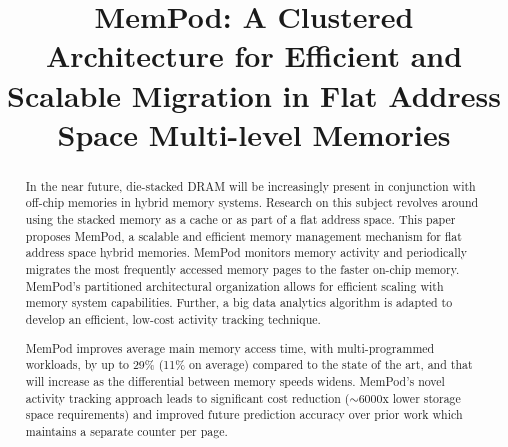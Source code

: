\documentclass{sig-alternate}
\title {MemPod: A Clustered Architecture for Efficient and Scalable Migration in Flat Address Space Multi-level Memories}
\author{}
\begin{document}
\maketitle
\thispagestyle{firstpage}
\pagestyle{plain}

\begin{abstract}

%

In the near future, die-stacked DRAM will be increasingly
present in conjunction with 
off-chip memories in hybrid memory systems. Research on this subject revolves around using the stacked memory as a cache or as part of a flat address space. This paper proposes MemPod, a scalable and efficient memory management mechanism for flat address space hybrid memories. MemPod monitors memory activity and periodically migrates the most frequently accessed memory pages to the faster on-chip memory. MemPod's partitioned architectural organization allows for efficient scaling with memory system capabilities. Further, a big data analytics algorithm is adapted to develop an efficient, low-cost activity tracking technique. 

MemPod improves average main memory access time, with multi-programmed workloads, by up to 29\% (11\% on average) compared to the state of the art, and that will increase as the differential between memory speeds
widens.
MemPod's novel activity tracking approach leads to significant cost reduction ($\sim$6000x lower storage space requirements) and improved future prediction accuracy over prior work which maintains a separate counter per page.

\end{abstract}
\end{document}
